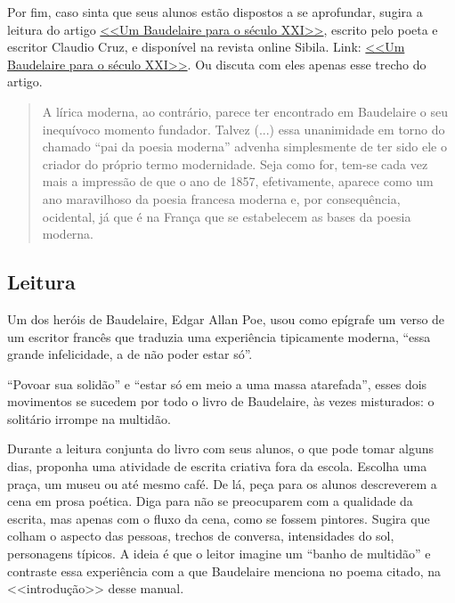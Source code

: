 \documentclass[12pt]{extarticle}
\begin{document}
\pagebreak

Por fim, caso sinta que seus alunos estão dispostos a se aprofundar, 
sugira a leitura do artigo \href{}{<<Um Baudelaire para o século XXI>>}, 
escrito pelo poeta e escritor Claudio Cruz, e disponível na 
revista online Sibila. Link: \href{http://sibila.com.br/novos-e-criticos/um-baudelaire-para-o-seculo-xxi/3579}{<<Um Baudelaire para o século XXI>>}. Ou discuta com eles apenas esse trecho do artigo.

\begin{quote}
A lírica moderna, ao contrário, parece ter encontrado em Baudelaire 
o seu inequívoco momento fundador. Talvez (...)
essa unanimidade em torno do chamado “pai da poesia moderna” advenha simplesmente 
de ter sido ele o criador do próprio termo modernidade. Seja como for, 
tem-se cada vez mais a impressão de que o ano de 1857, efetivamente, aparece como 
um ano maravilhoso da poesia francesa moderna e, por consequência, ocidental, já que 
é na França que se estabelecem as bases da poesia moderna.
\end{quote}





\subsection{Leitura}




Um dos heróis de Baudelaire, Edgar Allan Poe, usou como epígrafe um verso de 
um escritor francês que traduzia uma experiência tipicamente moderna, “essa 
grande infelicidade, a de não poder estar só”.
 
“Povoar sua solidão” e “estar só em meio a uma massa atarefada”,  
esses dois movimentos se sucedem por todo o livro de Baudelaire, às vezes misturados:
o solitário irrompe na multidão.


Durante a leitura conjunta do livro com seus alunos, 
o que pode tomar alguns dias, proponha uma atividade de escrita criativa 
fora da escola. Escolha uma praça, um museu ou até mesmo café. De lá, peça para os 
alunos descreverem a cena em prosa poética. Diga para não se preocuparem com a qualidade
da escrita, mas apenas com o fluxo da cena, como se fossem pintores. Sugira que colham 
o aspecto das pessoas, trechos de conversa, intensidades do sol, personagens típicos.
A ideia é que o leitor imagine um ``banho de multidão'' e contraste essa experiência 
com a que Baudelaire menciona no poema citado, na <<introdução>> desse manual. 
\end{document}
